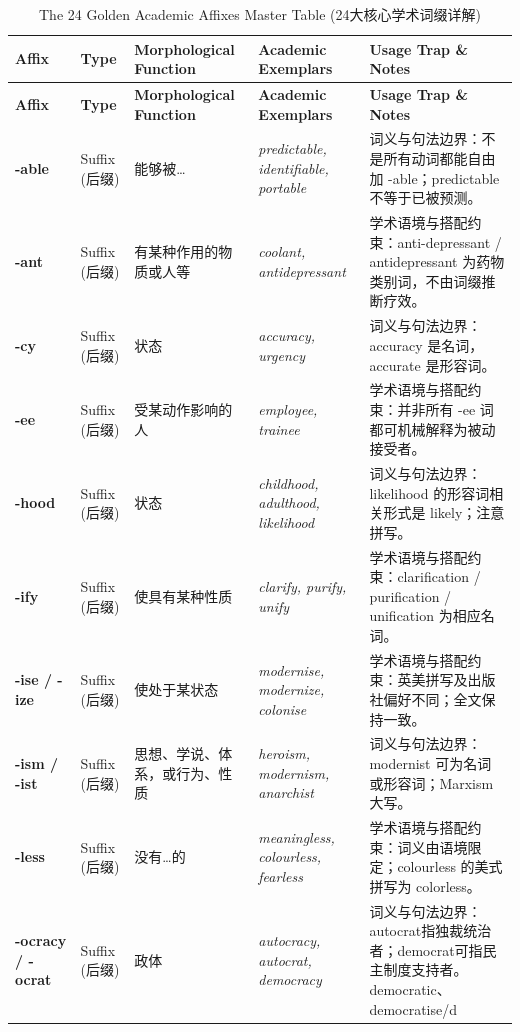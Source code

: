 \begingroup
\ReportTableStyle
\begin{longtable}{>{\raggedright\arraybackslash}p{2.2cm}>{\raggedright\arraybackslash}p{2.0cm}>{\raggedright\arraybackslash}p{3.2cm}>{\raggedright\arraybackslash}p{3.4cm}>{\raggedright\arraybackslash}p{3.4cm}}
\caption{The 24 Golden Academic Affixes Master Table (24大核心学术词缀详解)}\label{tab:affixes_24}\tabularnewline
\toprule
\textbf{\color{AcadNavy}Affix} & \textbf{\color{AcadNavy}Type} & \textbf{\color{AcadNavy}Morphological Function} & \textbf{\color{AcadNavy}Academic Exemplars} & \textbf{\color{AcadNavy}Usage Trap \& Notes} \tabularnewline
\midrule
\endfirsthead
\toprule
\textbf{\color{AcadNavy}Affix} & \textbf{\color{AcadNavy}Type} & \textbf{\color{AcadNavy}Morphological Function} & \textbf{\color{AcadNavy}Academic Exemplars} & \textbf{\color{AcadNavy}Usage Trap \& Notes} \tabularnewline
\midrule
\endhead
\bottomrule
\endfoot
\textbf{-able} & Suffix (后缀) & 能够被… & \textit{predictable, identifiable, portable} & 词义与句法边界：不是所有动词都能自由加 -able；predictable 不等于已被预测。 \tabularnewline
\textbf{-ant} & Suffix (后缀) & 有某种作用的物质或人等 & \textit{coolant, antidepressant} & 学术语境与搭配约束：anti-depressant / antidepressant 为药物类别词，不由词缀推断疗效。 \tabularnewline
\textbf{-cy} & Suffix (后缀) & 状态 & \textit{accuracy, urgency} & 词义与句法边界：accuracy 是名词，accurate 是形容词。 \tabularnewline
\textbf{-ee} & Suffix (后缀) & 受某动作影响的人 & \textit{employee, trainee} & 学术语境与搭配约束：并非所有 -ee 词都可机械解释为被动接受者。 \tabularnewline
\textbf{-hood} & Suffix (后缀) & 状态 & \textit{childhood, adulthood, likelihood} & 词义与句法边界：likelihood 的形容词相关形式是 likely；注意拼写。 \tabularnewline
\textbf{-ify} & Suffix (后缀) & 使具有某种性质 & \textit{clarify, purify, unify} & 学术语境与搭配约束：clarification / purification / unification 为相应名词。 \tabularnewline
\textbf{-ise / -ize} & Suffix (后缀) & 使处于某状态 & \textit{modernise, modernize, colonise} & 学术语境与搭配约束：英美拼写及出版社偏好不同；全文保持一致。 \tabularnewline
\textbf{-ism / -ist} & Suffix (后缀) & 思想、学说、体系，或行为、性质 & \textit{heroism, modernism, anarchist} & 词义与句法边界：modernist 可为名词或形容词；Marxism 大写。 \tabularnewline
\textbf{-less} & Suffix (后缀) & 没有…的 & \textit{meaningless, colourless, fearless} & 学术语境与搭配约束：词义由语境限定；colourless 的美式拼写为 colorless。 \tabularnewline
\textbf{-ocracy / -ocrat} & Suffix (后缀) & 政体 & \textit{autocracy, autocrat, democracy} & 词义与句法边界：autocrat指独裁统治者；democrat可指民主制度支持者。democratic、democratise/d \tabularnewline

\end{longtable}
